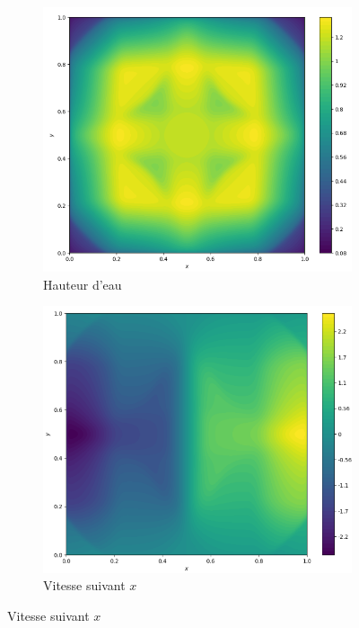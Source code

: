 \documentclass[
	french,
	11pt, %
]{fphw}
\begin{document}
\begin{figure}[H]
	\centering
	\begin{subfigure}{0.32\textwidth}
		\centering
		\includegraphics[width=\textwidth,height=0.85\textwidth]{Bord3h.png}
		\caption{Hauteur d'eau}
		\label{fig:Bord3h}
	\end{subfigure}
	\begin{subfigure}{0.32\textwidth}
		\centering
		\includegraphics[width=\textwidth,height=0.85\textwidth]{Bord3u.png}
		\caption{Vitesse suivant $x$}

\end{subfigure}
\end{figure}
\end{document}
